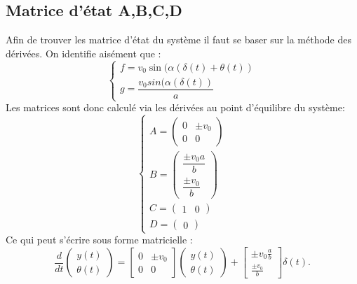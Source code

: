 \documentclass[11pt,a4paper]{article}
\begin{document}
\subsection{Matrice d'état A,B,C,D}
Afin de trouver les matrice d'état du système il faut se baser sur la méthode des dérivées.
On identifie aisément que :
\begin{equation}
    \begin{cases}
     f= v_0 \sin(\alpha(\delta(t)+\theta(t)) \\
     g= \dfrac{v_0 sin(\alpha(\delta(t))}{a} 
    \end{cases} 
\end{equation}
Les matrices sont donc calculé via les dérivées au point d'équilibre du système:
\begin{equation}
\begin{cases}
    A= \begin{pmatrix}
        0 & \pm v_0 \\
        0 & 0
    \end{pmatrix} \\
        B= \begin{pmatrix}
        \dfrac{\pm v_0 a}{b}  \\
        \dfrac{\pm v_0}{b}  
    \end{pmatrix} \\
            C= \begin{pmatrix}
            1 & 0 
    \end{pmatrix}\\
            D= \begin{pmatrix}
        0  
    \end{pmatrix}
\end{cases}
\end{equation}
Ce qui peut s'écrire sous forme matricielle : 
\[
\frac{d}{dt}
\begin{pmatrix}
    y(t) \\
    \theta(t)
\end{pmatrix}
=
\begin{bmatrix}
    0 & \pm v_0 \\
    0 & 0
\end{bmatrix}
\begin{pmatrix}
    y(t) \\
    \theta(t)
\end{pmatrix}
+
\begin{bmatrix}
    \pm v_0 \frac{a}{b} \\
    \frac{\pm v_0}{b}
\end{bmatrix}
\delta(t).
\]
\end{document}
